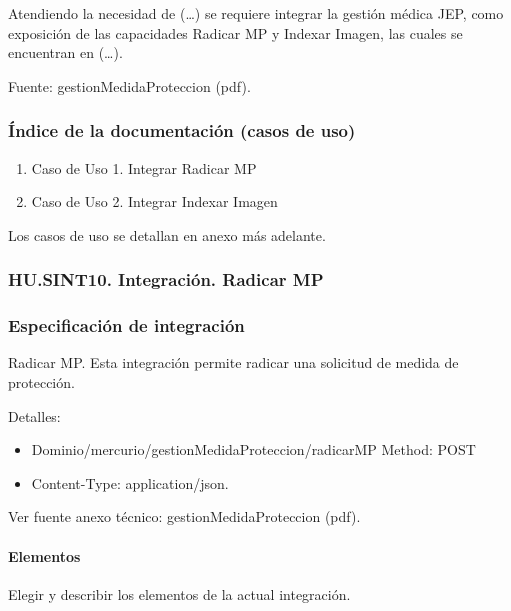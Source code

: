 \documentclass[
  paper=a4,
  ,captions=tableheading
]{scrartcl}
\providecommand{\tightlist}{%
  \setlength{\itemsep}{0pt}\setlength{\parskip}{0pt}}
\begin{document}
Atendiendo la necesidad de (\ldots) se requiere integrar la gestión
médica JEP, como exposición de las capacidades Radicar MP y Indexar
Imagen, las cuales se encuentran en (\ldots).

Fuente: gestionMedidaProteccion (pdf).

\subsubsection{Índice de la documentación (casos de
uso)}\label{sec:uxedndice-de-la-documentaciuxf3n-casos-de-uso-1}

\begin{enumerate}
\def\labelenumi{\arabic{enumi}.}
\tightlist
\item
  Caso de Uso 1. Integrar Radicar MP
\item
  Caso de Uso 2. Integrar Indexar Imagen
\end{enumerate}

Los casos de uso se detallan en anexo más adelante.

\subsubsection{HU.SINT10. Integración. Radicar
MP}\label{sec:hu.sint10.-integraciuxf3n.-radicar-mp}

\subsubsection{Especificación de
integración}\label{sec:especificaciuxf3n-de-integraciuxf3n}

Radicar MP. Esta integración permite radicar una solicitud de medida de
protección.

Detalles:

\begin{itemize}
\tightlist
\item
  Dominio/mercurio/gestionMedidaProteccion/radicarMP Method: POST
\item
  Content-Type: application/json.
\end{itemize}

Ver fuente anexo técnico: gestionMedidaProteccion (pdf).

\paragraph{Elementos}\label{sec:elementos}

Elegir y describir los elementos de la actual integración.
\end{document}
